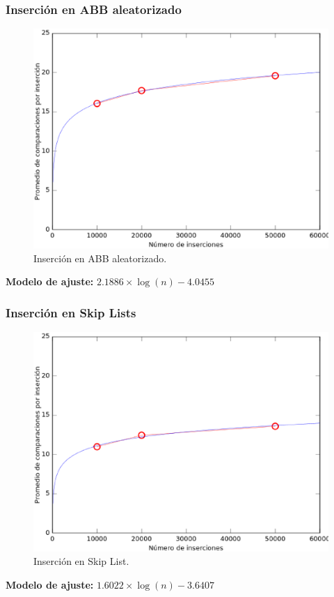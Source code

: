\documentclass[12pt,letterpaper]{article}
\begin{document}
\subsubsection{Inserción en ABB aleatorizado}
\begin{figure}[ht]
\centering
\includegraphics[scale=0.7]{iABBR.eps}
\caption{Inserción en ABB aleatorizado.}
\label{fig:iabbr}
\end{figure}
\textbf{Modelo de ajuste:} $2.1886 \times \log(n) - 4.0455$

\newpage
\subsubsection{Inserción en Skip Lists}
\begin{figure}[ht]
\centering
\includegraphics[scale=0.7]{iSL.eps}
\caption{Inserción en Skip List.}
\label{fig:isl}
\end{figure}
\textbf{Modelo de ajuste:} $1.6022 \times \log(n) - 3.6407$
\end{document}
